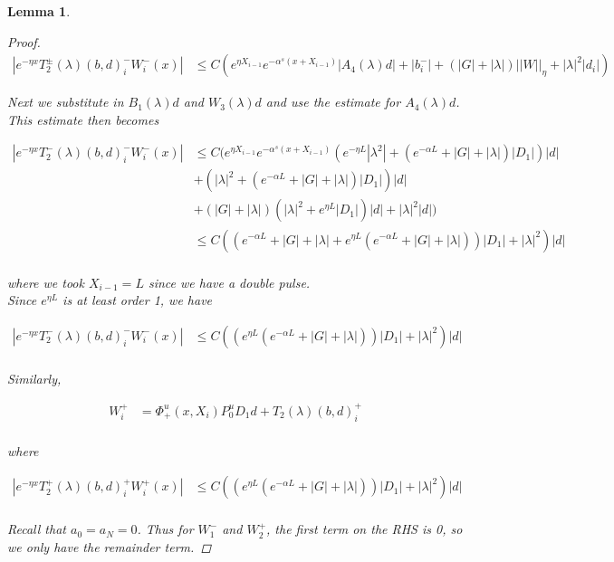 \documentclass[12pt]{article}
\newtheorem{lemma}{Lemma}
\begin{document}
\begin{lemma}
\begin{proof}
\begin{align*}
|e^{-\eta x} T_2^\pm(\lambda)(b,d)_i^- W_i^-(x)| &\leq C \left( e^{\eta X_{i-1}} e^{-\alpha^s(x + X_{i-1})} |A_4(\lambda)d| + |b_i^-| + \left(|G| +|\lambda|\right)||W||_\eta + |\lambda|^2 |d_i| \right)
\end{align*}

Next we substitute in $B_1(\lambda)d$ and $W_3(\lambda)d$ and use the estimate for $A_4(\lambda)d$. This estimate then becomes

\begin{align*}
| e^{-\eta x} T_2^-(\lambda)(b,d)_i^- W_i^-(x) | &\leq C ( e^{\eta X_{i-1}} e^{-\alpha^s(x + X_{i-1})} \left( e^{-\eta L}|\lambda^2| + (e^{-\alpha L} + |G| + |\lambda|)|D_1| \right)|d| \\
&+ (|\lambda|^2 + (e^{-\alpha L} + |G| + |\lambda|)|D_1| )|d| \\
&+ \left(|G| +|\lambda|\right)\left( |\lambda|^2 + e^{\eta L}|D_1|\right)|d| + |\lambda|^2 |d| )\\
&\leq C\left( \left( e^{-\alpha L} + |G| + |\lambda| + e^{\eta L}(e^{-\alpha L} + |G| + |\lambda|) \right)|D_1| + |\lambda|^2 \right) |d| \\
\end{align*}

where we took $X_{i-1} = L$ since we have a double pulse.\\

Since $e^{\eta L}$ is at least order 1, we have

\begin{align*}
| e^{-\eta x} T_2^-(\lambda)(b,d)_i^- W_i^-(x) | &\leq C\left(\left( e^{\eta L}(e^{-\alpha L} + |G| + |\lambda|) \right)|D_1| + |\lambda|^2 \right) |d| \\
\end{align*}

Similarly,

\begin{align*}
W_i^+ &= \Phi^u_+(x, X_i) P_0^u D_1 d + T_2(\lambda)(b,d)_i^+\\
\end{align*}

where 

\begin{align*}
| e^{-\eta x} T_2^+(\lambda)(b,d)_i^+ W_i^+(x) | &\leq C\left(\left( e^{\eta L}(e^{-\alpha L} + |G| + |\lambda|) \right)|D_1| + |\lambda|^2 \right) |d| \\
\end{align*}

Recall that $a_0 = a_N = 0$. Thus for $W_1^-$ and $W_2^+$, the first term on the RHS is 0, so we only have the remainder term.

\end{proof}
\end{lemma}
\end{document}
